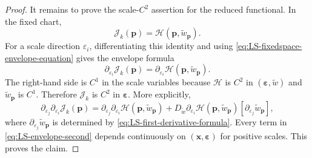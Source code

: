 \documentclass[11pt,reqno,a4paper]{amsart}
\numberwithin{equation}{section}
\theoremstyle{plain}
\theoremstyle{remark}
\theoremstyle{plain}
\begin{document}
\begin{proof}
It remains to prove the scale-$C^2$ assertion for the reduced functional.  In the fixed chart,
\[
\mathcal J_k(\mathbf p)=\mathscr H(\mathbf p,\tilde w_{\mathbf p}).
\]
For a scale direction $\varepsilon_i$, differentiating this identity and using
\eqref{eq:LS-fixedspace-envelope-equation} gives the envelope formula
\begin{equation}\label{eq:LS-envelope-first}
\partial_{\varepsilon_i}\mathcal J_k(\mathbf p)
=
\partial_{\varepsilon_i}\mathscr H(\mathbf p,\tilde w_{\mathbf p}).
\end{equation}
The right-hand side is $C^1$ in the scale variables because
$\mathscr H$ is $C^2$ in $(\boldsymbol\varepsilon,\tilde w)$ and
$\tilde w_{\mathbf p}$ is $C^1$.  Therefore
$\mathcal J_k$ is $C^2$ in $\boldsymbol\varepsilon$.  More explicitly,
\begin{equation}\label{eq:LS-envelope-second}
\partial_{\varepsilon_j}\partial_{\varepsilon_i}\mathcal J_k(\mathbf p)
=
\partial_{\varepsilon_j}\partial_{\varepsilon_i}
\mathscr H(\mathbf p,\tilde w_{\mathbf p})
+
D_{\tilde w}\partial_{\varepsilon_i}\mathscr H(\mathbf p,\tilde w_{\mathbf p})
[\partial_{\varepsilon_j}\tilde w_{\mathbf p}],
\end{equation}
where $\partial_{\varepsilon_j}\tilde w_{\mathbf p}$ is determined by
\eqref{eq:LS-first-derivative-formula}.  Every term in
\eqref{eq:LS-envelope-second} depends continuously on
$(\mathbf x,\boldsymbol\varepsilon)$ for positive scales.  This proves the claim.
\end{proof}
\end{document}
